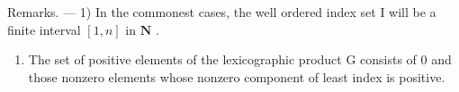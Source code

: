 Remarks. --- 1) In the commonest cases, the well ordered index set I will be a finite interval \([1, n]\) in \(\mathbf{N}\) .

\begin{enumerate}
\def\labelenumi{\arabic{enumi})}
\setcounter{enumi}{1}
\tightlist
\item
  The set of positive elements of the lexicographic product G consists of 0 and those nonzero elements whose nonzero component of least index is positive.
\end{enumerate}

